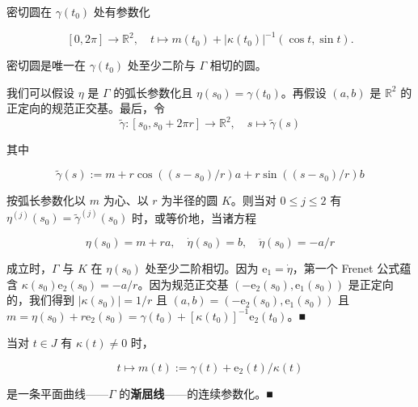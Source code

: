 \begin{remark}

\begin{items}
\item

密切圆在 $ \gamma(t_{0}) $ 处有参数化

\[
[0, 2\pi] \to \mathbb{R}^{2} , \quad t \mapsto m(t_{0}) + |\kappa(t_{0})|^{-1}(\cos t, \sin t) .
\]
\item

密切圆是唯一在 $ \gamma(t_{0}) $ 处至少二阶与 $ \Gamma $ 相切的圆。

\proofhead
我们可以假设 $ \eta $ 是 $ \Gamma $ 的弧长参数化且 $ \eta(s_{0}) = \gamma(t_{0}) $。再假设 $ (a, b) $ 是 $ \mathbb{R}^{2} $ 的正定向的规范正交基。最后，令
\[
\tilde{\gamma} : [s_{0}, s_{0} + 2\pi r] \to \mathbb{R}^{2} , \quad s \mapsto \tilde{\gamma}(s)
\]

其中

\[
\tilde{\gamma}(s) := m + r\cos\left((s - s_{0})/r\right)a + r\sin\left((s - s_{0})/r\right)b
\]

按弧长参数化以 $ m $ 为心、以 $ r $ 为半径的圆 $ K $。则当对 $ 0 \le j \le 2 $ 有 $ \eta^{(j)}(s_{0}) = \tilde{\gamma}^{(j)}(s_{0}) $ 时，或等价地，当诸方程

\[
\eta(s_{0}) = m + ra , \quad \dot{\eta}(s_{0}) = b , \quad \ddot{\eta}(s_{0}) = -a/r
\]

成立时，$ \Gamma $ 与 $ K $ 在 $ \eta(s_{0}) $ 处至少二阶相切。因为 $ \mathrm{e}_{1} = \dot{\eta} $，第一个 Frenet 公式蕴含 $ \kappa(s_{0})\mathrm{e}_{2}(s_{0}) = -a/r $。因为规范正交基 $ \left(-\mathrm{e}_{2}(s_{0}), \mathrm{e}_{1}(s_{0})\right) $ 是正定向的，我们得到 $ |\kappa(s_{0})| = 1/r $ 且 $ (a, b) = \left(-\mathrm{e}_{2}(s_{0}), \mathrm{e}_{1}(s_{0})\right) $ 且 $ m = \eta(s_{0}) + r\mathrm{e}_{2}(s_{0}) = \gamma(t_{0}) + [\kappa(t_{0})]^{-1}\mathrm{e}_{2}(t_{0}) $。\nobreak\hspace{0.35em}■

\item

当对 $ t \in J $ 有 $ \kappa(t) \ne 0 $ 时，

\[
t \mapsto m(t) := \gamma(t) + \mathrm{e}_{2}(t)/\kappa(t)
\]

是一条平面曲线——$ \Gamma $ 的\textbf{渐屈线}——的连续参数化。\nobreak\hspace{0.35em}■

\end{items}

\end{remark}

